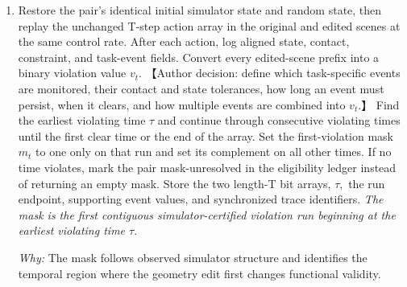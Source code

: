 \documentclass[10pt,a4paper]{article}
\begin{document}
\begin{enumerate}[leftmargin=*,start=1]
  \item Restore the pair's identical initial simulator state and random state, then replay the unchanged T-step action array in the original and edited scenes at the same control rate. After each action, log aligned state, contact, constraint, and task-event fields. Convert every edited-scene prefix into a binary violation value \(v_{t}.\) 【Author decision: define which task-specific events are monitored, their contact and state tolerances, how long an event must persist, when it clears, and how multiple events are combined into \(v_{t}.\)】 Find the earliest violating time \(\tau \) and continue through consecutive violating times until the first clear time or the end of the array. Set the first-violation mask \(m_{t}\) to one only on that run and set its complement on all other times. If no time violates, mark the pair mask-unresolved in the eligibility ledger instead of returning an empty mask. Store the two length-T bit arrays, \(\tau ,\) the run endpoint, supporting event values, and synchronized trace identifiers.
\noindent\emph{The mask is the first contiguous simulator-certified violation run beginning at the earliest violating time \(\tau .\)}
\par{}
\par\emph{Why:} The mask follows observed simulator structure and identifies the temporal region where the geometry edit first changes functional validity.

\end{enumerate}
\end{document}
